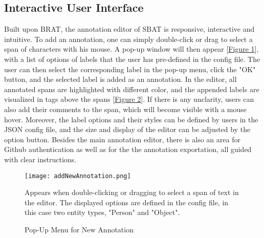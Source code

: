 \documentclass[12ptm a4paper]{article}
\begin{document}
\subsection{Interactive User Interface}
Built upon BRAT, the annotation editor of SBAT is responsive, interactive and intuitive. To add an annotation, one can simply double-click or drag to select a span of characters with his mouse. A pop-up window will then appear [\hyperref[figure1]{Figure 1}], with a list of options of labels that the user has pre-defined in the config file. The user can then select the corresponding label in the pop-up menu, click the "OK" button, and the selected label is added as an annotation. In the editor, all annotated spans are highlighted with different color, and the appended labels are visualized in tags above the spans [\hyperref[figure2]{Figure 2}]. If there is any unclarity, users can also add their comments to the span, which will become visible with a mouse hover. Moreover, the label options and their styles can be defined by users in the JSON config file, and the size and display of the editor can be adjusted by the option button. Besides the main annotation editor, there is also an area for Github authentication as well as for the the annotation exportation, all guided with clear instructions.
\begin{figure}[H]
{\centering
\texttt{[image: addNewAnnotation.png]}
\label{figure1}
\caption{Pop-Up Menu for New Annotation}
}
{\scriptsize Appears when double-clicking or dragging to select a span of text in the editor. The displayed options are defined in the config file, in this case two entity types, "Person" and "Object".\par} 
\end{figure}
\end{document}
